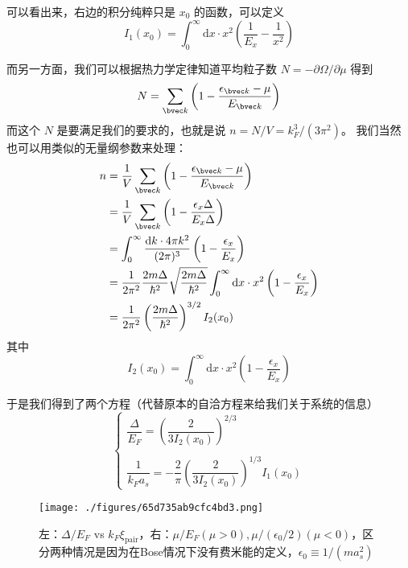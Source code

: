 可以看出来，右边的积分纯粹只是 $x_0$ 的函数，可以定义
\begin{equation}
I_1(x_0) = \int_0^\infty \text{d}x\cdot x^2\left(\frac{1}{E_x}-\frac{1}{x^2}\right)
\end{equation}

而另一方面，我们可以根据热力学定律知道平均粒子数 $N=-\partial\Omega/\partial\mu$ 得到
\begin{equation}
N = \sum_{\bvec k}\left(1-\frac{\epsilon_{\bvec k}-\mu}{E_{\bvec k}}\right)
\end{equation}
而这个 $N$ 是要满足我们的要求的，也就是说 $n=N/V=k_F^3/(3\pi^2)$。 我们当然也可以用类似的无量纲参数来处理：
\begin{equation}
\begin{split}
n &= \frac{1}{V}\sum_{\bvec k}\left(1-\frac{\epsilon_{\bvec k}-\mu}{E_{\bvec k}}\right)\\
&=\frac{1}{V}\sum_{\bvec k}\left(1-\frac{\epsilon_x{\Delta}}{E_x{\Delta}}\right)\\ %
&=\int_0^\infty\frac{\text{d}k \cdot 4\pi k^2}{(2\pi)^3}\left(1-\frac{\epsilon_x}{E_x}\right)\\
&=\frac{1}{2\pi^2}\frac{2m\Delta}{\hbar^2}\sqrt{\frac{2m\Delta}{\hbar^2}}\int_0^\infty\text{d}x\cdot x^2\left(1-\frac{\epsilon_x}{E_x}\right)\\
&=\frac{1}{2\pi^2}\left(\frac{2m\Delta}{\hbar^2}\right)^{3/2}I_2(x_0)
\end{split}
\end{equation}
其中
\begin{equation}
I_2(x_0)=\int_0^\infty \text{d}x\cdot x^2\left(1-\frac{\epsilon_x}{E_x}\right)
\end{equation}

于是我们得到了两个方程（代替原本的自洽方程来给我们关于系统的信息）
\begin{equation}
\begin{cases}
\dfrac{\Delta}{E_F} = \left(\dfrac{2}{3I_2(x_0)}\right)^{2/3}\\
\ \\
\dfrac{1}{k_Fa_s} = -\dfrac{2}{\pi}\left(\dfrac{2}{3I_2(x_0)}\right)^{1/3}I_1(x_0)
\end{cases}
\end{equation}

\begin{figure}[ht]
\centering
\texttt{[image: ./figures/65d735ab9cfc4bd3.png]}
\caption{左：$\Delta/E_F$ vs $k_F\xi_{\text{pair}}$，右：$\mu/E_F(\mu>0), \mu/(\epsilon_0/2)(\mu<0)$，区分两种情况是因为在Bose情况下没有费米能的定义，$\epsilon_0\equiv1/(ma_s^2)$} \label{fig_BCSBEC_1}
\end{figure}

